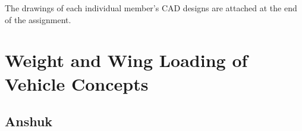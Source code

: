     The drawings of each individual member's CAD designs are attached at the end of the assignment.

\section{Weight and Wing Loading of Vehicle Concepts}
    
    \subsection{Anshuk}
